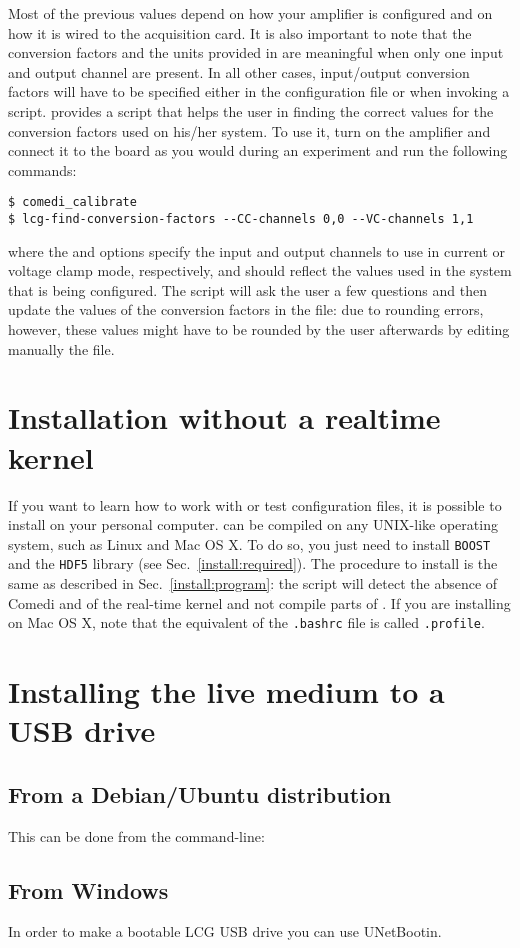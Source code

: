 Most of the previous values depend on how your amplifier is configured
and on how it is wired to the acquisition card. It is also important to
note that the conversion factors and the units provided in
 are meaningful when only one input and output
channel are present. In all other cases, input/output conversion
factors will have to be specified either in the configuration file or
when invoking a script. \progname provides a script that helps the
user in finding the correct values for the conversion factors used on
his/her system. To use it, turn on the amplifier and connect it to the
board as you would during an experiment and run the following commands:
\begin{lstlisting}
$ comedi_calibrate
$ lcg-find-conversion-factors --CC-channels 0,0 --VC-channels 1,1
\end{lstlisting}
where the  and 
options specify the input and output channels to use in current or
voltage clamp mode, respectively, and should reflect the values
used in the system that is being configured.
The script will ask the user a few questions and then update the
values of the conversion factors in the  file:
due to rounding errors, however, these values might have to be rounded
by the user afterwards by editing manually the
 file.

\section{Installation without a realtime kernel}
\label{install:nokernel}
If you want to learn how to work with \progname or test configuration
files, it is possible to install \progname on your personal
computer. \progname can be compiled on any UNIX-like operating system,
such as Linux and Mac OS X. To do so, you just need to install
\texttt{BOOST} and the \texttt{HDF5} library (see
Sec.~\ref{install:required}). The procedure to install \progname is
the same as described in Sec.~\ref{install:program}: the
 script will detect the absence of Comedi and of
the real-time kernel and not compile parts of \progname. If you are
installing \progname on Mac OS X, note that the equivalent of the
\verb+.bashrc+ file is called \verb+.profile+.

\section{Installing the live medium to a USB drive}
\label{note:liveUSB}
\subsection{From a Debian/Ubuntu distribution}
This can be done from the command-line:

\subsection{From Windows}
In order to make a bootable LCG USB drive you can use UNetBootin.

